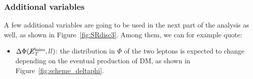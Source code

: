 \documentclass[a4paper, 10pt, openright]{report}
\begin{document}
\subsubsection*{Additional variables}

A few additional variables are going to be used in the next part of the analysis as well, as shown in Figure~\ref{fig:SRdisc3}. Among them, we can for example quote:
\begin{itemize}
\item $\Delta \Phi(\cancel{E}_{T}^{\text{miss}}, ll)$: the distribution in $\Phi$ of the two leptons is expected to change depending on the eventual production of \ac{DM}, as shown in Figure~\ref{fig:scheme_deltaphi}. 

\begin{minipage}[c]{.32\linewidth}
   \end{minipage} \hfill
   \begin{minipage}[c]{.32\linewidth}
   \end{minipage} \hfill
   \begin{minipage}[c]{.32\linewidth}
\end{minipage}
\end{itemize}
\end{document}
